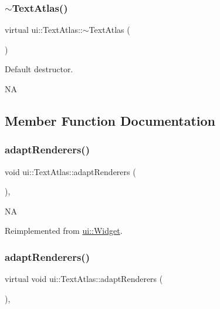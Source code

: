 \subsubsection{\texorpdfstring{$\sim$\+Text\+Atlas()}{~TextAtlas()}\hspace{0.1cm}{\footnotesize\ttfamily [2/2]}}
{\footnotesize\ttfamily virtual ui\+::\+Text\+Atlas\+::$\sim$\+Text\+Atlas (\begin{DoxyParamCaption}{ }\end{DoxyParamCaption})\hspace{0.3cm}{\ttfamily [virtual]}}

Default destructor.

NA 

\subsection{Member Function Documentation}
\mbox{\label{classui_1_1TextAtlas_a8197f84d1abe2f05752551cad33438aa}} 
\subsubsection{\texorpdfstring{adapt\+Renderers()}{adaptRenderers()}\hspace{0.1cm}{\footnotesize\ttfamily [1/2]}}
{\footnotesize\ttfamily void ui\+::\+Text\+Atlas\+::adapt\+Renderers (\begin{DoxyParamCaption}{ }\end{DoxyParamCaption})\hspace{0.3cm}{\ttfamily [override]}, {\ttfamily [virtual]}}

NA 

Reimplemented from \hyperlink{classui_1_1Widget}{ui\+::\+Widget}.

\mbox{\label{classui_1_1TextAtlas_ad77f295e4f6fe205cf0da0da9330097b}} 
\subsubsection{\texorpdfstring{adapt\+Renderers()}{adaptRenderers()}\hspace{0.1cm}{\footnotesize\ttfamily [2/2]}}
{\footnotesize\ttfamily virtual void ui\+::\+Text\+Atlas\+::adapt\+Renderers (\begin{DoxyParamCaption}{ }\end{DoxyParamCaption})\hspace{0.3cm}{\ttfamily [override]}, {\ttfamily [virtual]}}

